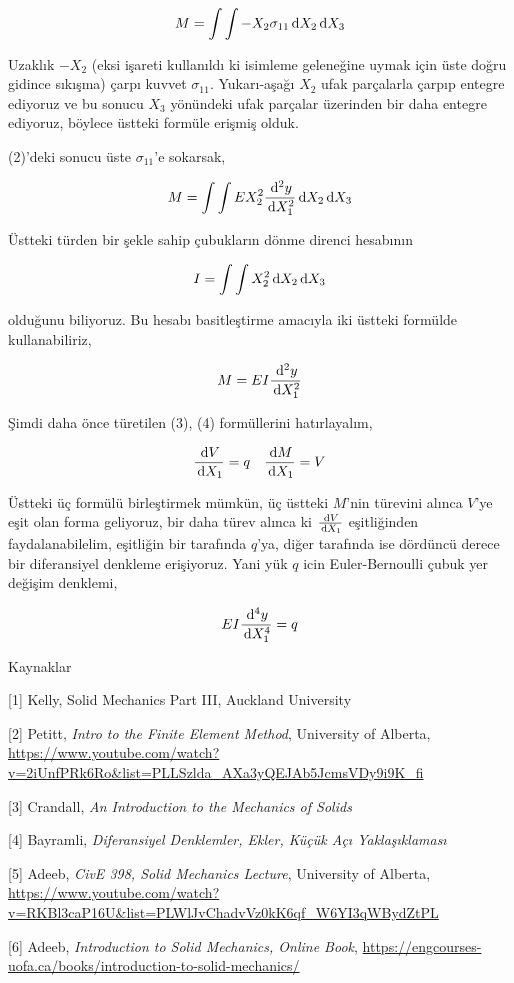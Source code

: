 \documentclass[12pt,fleqn]{article}\usepackage{../../common}
\begin{document}
$$
M = \int \int -X_2 \sigma_{11} \,\mathrm{d} X_2 \,\mathrm{d} X_3
$$

Uzaklık $-X_2$ (eksi işareti kullanıldı ki isimleme geleneğine uymak için üste
doğru gidince sıkışma) çarpı kuvvet $\sigma_{11}$. Yukarı-aşağı $X_2$ ufak
parçalarla çarpıp entegre ediyoruz ve bu sonucu $X_3$ yönündeki ufak parçalar
üzerinden bir daha entegre ediyoruz, böylece üstteki formüle erişmiş olduk. 

(2)'deki sonucu üste $\sigma_{11}$'e sokarsak,

$$
M = \int \int E X_2^2 \frac{\,\mathrm{d}^2 y}{\,\mathrm{d} X_1^2} \,\mathrm{d} X_2 \,\mathrm{d} X_3
$$

Üstteki türden bir şekle sahip çubukların dönme direnci hesabının

$$
I = \int \int X_2^2 \,\mathrm{d} X_2 \,\mathrm{d} X_3
$$

olduğunu biliyoruz. Bu hesabı basitleştirme amacıyla iki üstteki formülde
kullanabiliriz,

$$
M = E I \frac{\,\mathrm{d}^2 y}{\,\mathrm{d} X_1^2} 
$$

Şimdi daha önce türetilen (3), (4) formüllerini hatırlayalım,

$$
\frac{\,\mathrm{d} V}{\,\mathrm{d} X_1} = q \quad \frac{\,\mathrm{d} M}{\,\mathrm{d} X_1} = V
$$

Üstteki üç formülü birleştirmek mümkün, üç üstteki $M$'nin türevini
alınca $V$'ye eşit olan forma geliyoruz, bir daha türev alınca ki $\frac{\,\mathrm{d} V}{\,\mathrm{d} X_1}$
eşitliğinden faydalanabilelim, eşitliğin bir tarafında $q$'ya, diğer tarafında
ise dördüncü derece bir diferansiyel denkleme erişiyoruz. Yani yük $q$ icin
Euler-Bernoulli çubuk yer değişim denklemi,

$$
E I \frac{\,\mathrm{d}^4 y}{\,\mathrm{d} X_1^4} = q
$$

Kaynaklar

[1] Kelly, Solid Mechanics Part III, Auckland University

[2] Petitt, {\em Intro to the Finite Element Method}, University of Alberta,
    \url{https://www.youtube.com/watch?v=2iUnfPRk6Ro&list=PLLSzlda_AXa3yQEJAb5JcmsVDy9i9K_fi}

[3] Crandall, {\em An Introduction to the Mechanics of Solids}

[4] Bayramli, {\em Diferansiyel Denklemler, Ekler, Küçük Açı Yaklaşıklaması}

[5] Adeeb, {\em CivE 398, Solid Mechanics Lecture}, University of Alberta,
    \url{https://www.youtube.com/watch?v=RKBl3caP16U&list=PLWlJvChadvVz0kK6qf_W6YI3qWBydZtPL}

[6] Adeeb, {\em Introduction to Solid Mechanics, Online Book},
    \url{https://engcourses-uofa.ca/books/introduction-to-solid-mechanics/}
\end{document}
